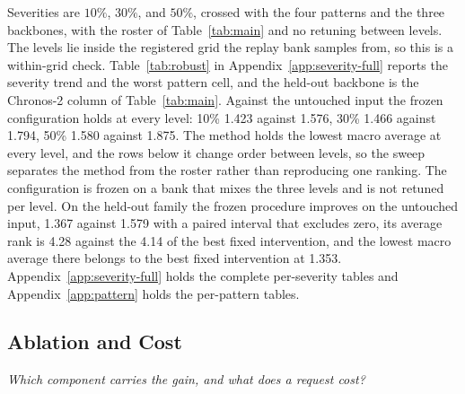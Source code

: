 \documentclass{article}
\begin{document}
Severities are $10\%$, $30\%$, and $50\%$, crossed with the four patterns and the three
backbones, with the roster of Table~\ref{tab:main} and no retuning between levels. The levels
lie inside the registered grid the replay bank samples from, so this is a within-grid check.
Table~\ref{tab:robust} in Appendix~\ref{app:severity-full} reports the severity trend and the worst pattern cell, and the
held-out backbone is the Chronos-2 column of Table~\ref{tab:main}.
Against the untouched input the frozen configuration holds at every level: 10\% 1.423 against 1.576, 30\% 1.466 against 1.794, 50\% 1.580 against 1.875. The method holds the lowest macro average at every level, and the rows below it change order between levels, so the sweep separates the method from the roster rather than reproducing one ranking. The configuration is frozen on a bank that mixes the three levels and is not retuned per level. On the held-out family the frozen procedure improves on the untouched input, 1.367 against 1.579 with a paired interval that excludes zero, its average rank is 4.28 against the 4.14 of the best fixed intervention, and the lowest macro average there belongs to the best fixed intervention at 1.353.
Appendix~\ref{app:severity-full} holds the complete per-severity tables and
Appendix~\ref{app:pattern} holds the per-pattern tables.
\subsection{Ablation and Cost}
\label{sec:exp-ablation}
\emph{Which component carries the gain, and what does a request cost?}
\end{document}
